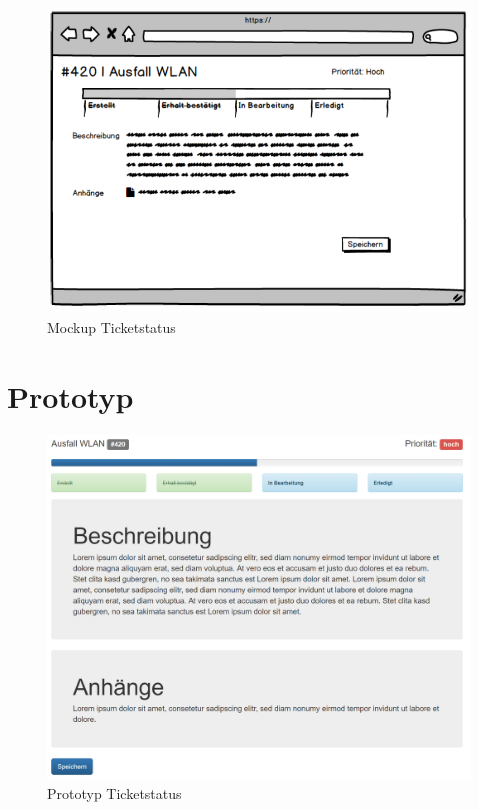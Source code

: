 \vspace{.5cm}
\begin{figure}[h]
	\centering
	\includegraphics[scale=0.582]{figures/Wireframe_Ticket.png}
	\caption{Mockup Ticketstatus}
	\label{Abb_Mockup_Ticketstatus}
\end{figure}	

\newpage
\section{Prototyp}
\begin{figure}[h]
	\centering
	\includegraphics[scale=0.8]{figures/Prototyp.png}
	\caption{Prototyp Ticketstatus}
	\label{Abb_Prototyp_Ticketstatus}
\end{figure}


